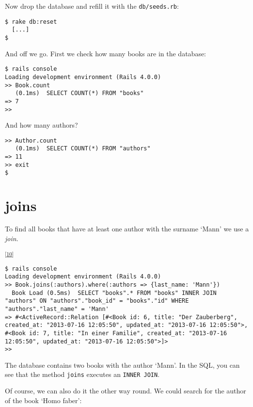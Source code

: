 \documentclass[a4paper]{book}
\newcounter{tab}[chapter]
\newcommand{\chap}[1]{\newpage\thispagestyle{empty}\chapter{#1}\label{chap:\thechapter}}
\begin{document}
Now drop the database and refill it with the \texttt{db/seeds.rb}:

\begin{shaded}\begin{verbatim}
$ rake db:reset
  [...]
$
\end{verbatim}\end{shaded}

And off we go. First we check how many books are in the database:

\begin{shaded}\begin{verbatim}
$ rails console
Loading development environment (Rails 4.0.0)
>> Book.count
   (0.1ms)  SELECT COUNT(*) FROM "books"
=> 7
>>
\end{verbatim}\end{shaded}

And how many authors?

\begin{shaded}\begin{verbatim}
>> Author.count
   (0.1ms)  SELECT COUNT(*) FROM "authors"
=> 11
>> exit
$
\end{verbatim}\end{shaded}

\chap{joins}\label{joins}

To find all books that have at least one author with the surname `Mann' we use a \emph{join}.

\textsuperscript{{[}\hyperref[ftn.idp4450352]{10}{]}}

\begin{shaded}\begin{verbatim}
$ rails console
Loading development environment (Rails 4.0.0)
>> Book.joins(:authors).where(:authors => {last_name: 'Mann'})
  Book Load (0.5ms)  SELECT "books".* FROM "books" INNER JOIN "authors" ON "authors"."book_id" = "books"."id" WHERE "authors"."last_name" = 'Mann'
=> #<ActiveRecord::Relation [#<Book id: 6, title: "Der Zauberberg", created_at: "2013-07-16 12:05:50", updated_at: "2013-07-16 12:05:50">, #<Book id: 7, title: "In einer Familie", created_at: "2013-07-16 12:05:50", updated_at: "2013-07-16 12:05:50">]>
>>
\end{verbatim}\end{shaded}

The database contains two books with the author `Mann'. In the SQL, you can see that the method \texttt{joins} executes an \texttt{INNER JOIN}.

Of course, we can also do it the other way round. We could search for the author of the book `Homo faber':
\end{document}
